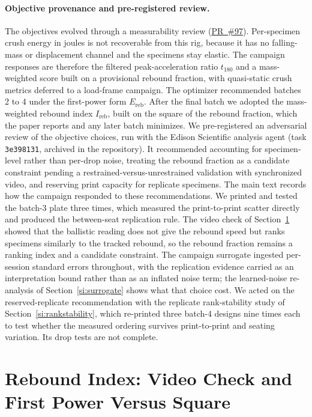 \documentclass[11pt]{article}
\newcommand{\repo}{https://github.com/vertical-cloud-lab/tensegrity-optimization}
\begin{document}
\paragraph{Objective provenance and pre-registered review.} The objectives
evolved through a measurability review
(\href{\repo/pull/97}{PR~\#97}). Per-specimen crush energy in joules is not
recoverable from this rig, because it has no falling-mass or displacement
channel and the specimens stay elastic. The campaign responses are therefore the
filtered peak-acceleration ratio $t_{180}$ and a mass-weighted score built
on a provisional rebound fraction, with quasi-static crush metrics
deferred to a load-frame campaign. The optimizer recommended batches 2 to
4 under the first-power form $E_{\mathrm{reb}}$. After the final batch we
adopted the mass-weighted rebound index $I_{\mathrm{reb}}$, built on the
square of the rebound fraction, which the paper reports and any later
batch minimizes. We pre-registered an
adversarial review of the objective choices, run with the Edison
Scientific analysis agent (task \texttt{3e398131}, archived in the
repository). It
recommended accounting for specimen-level rather than per-drop noise, treating
the rebound fraction as a candidate constraint pending a
restrained-versus-unrestrained validation with synchronized video,
and reserving print capacity for replicate specimens. The main text
records how the campaign responded to these recommendations. We
printed and tested the batch-3 plate three times, which measured
the print-to-print scatter directly and produced the between-seat
replication rule. The video check of Section~\ref{si:rebound} showed that
the ballistic reading does not give the rebound speed but ranks
specimens similarly to the tracked rebound, so the rebound fraction
remains a ranking index and a candidate constraint. The campaign
surrogate ingested per-session standard errors throughout, with the
replication evidence carried as an interpretation bound rather than as
an inflated noise term; the learned-noise re-analysis of
Section~\ref{si:surrogate} shows what that choice cost. We acted on the reserved-replicate
recommendation with the replicate rank-stability study of
Section~\ref{si:rankstability}, which re-printed three batch-4 designs
nine times each to test whether the measured ordering survives
print-to-print and seating variation. Its drop tests are not complete.

\section{Rebound Index: Video Check and First Power Versus Square}
\label{si:rebound}
\end{document}
